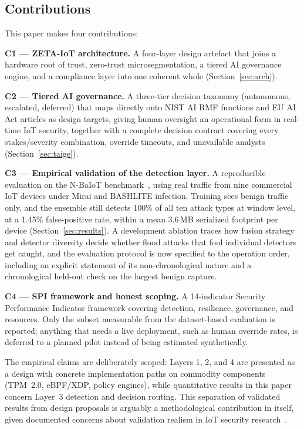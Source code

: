 \documentclass[sigconf,review,anonymous]{acmart}
\begin{document}
\subsection{Contributions}

This paper makes four contributions:

\textbf{C1 --- ZETA-IoT architecture.} A four-layer design artefact that joins a hardware root of trust, zero-trust microsegmentation, a tiered AI governance engine, and a compliance layer into one coherent whole (Section~\ref{sec:arch}).

\textbf{C2 --- Tiered AI governance.} A three-tier decision taxonomy (autonomous, escalated, deferred) that maps directly onto NIST AI RMF functions and EU AI Act articles as design targets, giving human oversight an operational form in real-time IoT security, together with a complete decision contract covering every stakes/severity combination, override timeouts, and unavailable analysts (Section~\ref{sec:taige}).

\textbf{C3 --- Empirical validation of the detection layer.} A reproducible evaluation on the N-BaIoT benchmark~\cite{meidan2018nbaiot}, using real traffic from nine commercial IoT devices under Mirai and BASHLITE infection. Training sees benign traffic only, and the ensemble still detects 100\% of all ten attack types at window level, at a 1.45\% false-positive rate, within a mean 3.6\,MB serialized footprint per device (Section~\ref{sec:results}). A development ablation traces how fusion strategy and detector diversity decide whether flood attacks that fool individual detectors get caught, and the evaluation protocol is now specified to the operation order, including an explicit statement of its non-chronological nature and a chronological held-out check on the largest benign capture.

\textbf{C4 --- SPI framework and honest scoping.} A 14-indicator Security Performance Indicator framework covering detection, resilience, governance, and resources. Only the subset measurable from the dataset-based evaluation is reported; anything that needs a live deployment, such as human override rates, is deferred to a planned pilot instead of being estimated synthetically.

The empirical claims are deliberately scoped: Layers 1, 2, and 4 are presented as a design with concrete implementation paths on commodity components (TPM~2.0, eBPF/XDP, policy engines), while quantitative results in this paper concern Layer~3 detection and decision routing. This separation of validated results from design proposals is arguably a methodological contribution in itself, given documented concerns about validation realism in IoT security research~\cite{arp2022dodo}.
\end{document}
